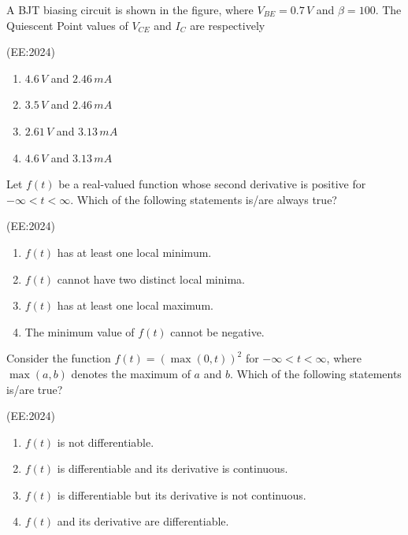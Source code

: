    \item A BJT biasing circuit is shown in the figure, where $V_{BE} = 0.7\, V$ and $\beta = 100$. The Quiescent Point values of $V_{CE}$ and $I_C$ are respectively 
	    
	   
	    \hfill{(EE:2024)}
		\begin{multicols}{2}
    \begin{enumerate}
        \item $4.6\, V$ and $2.46\, mA$
        \item $3.5\, V$ and $2.46\, mA$
        \item $2.61\, V$ and $3.13\, mA$
        \item $4.6\, V$ and $3.13\, mA$
    \end{enumerate}
			\end{multicols}

    \item Let $f(t)$ be a real-valued function whose second derivative is positive for $-\infty < t < \infty$. Which of the following statements is/are always true?
	  
	    \hfill{(EE:2024)}

    \begin{enumerate}
        \item $f(t)$ has at least one local minimum.
        \item $f(t)$ cannot have two distinct local minima.
        \item $f(t)$ has at least one local maximum.
        \item The minimum value of $f(t)$ cannot be negative.
    \end{enumerate}

    \item Consider the function $f(t) = (\max(0, t))^2$ for $-\infty < t < \infty$, where $\max(a, b)$ denotes the maximum of $a$ and $b$. Which of the following statements is/are true? 

	    \hfill{(EE:2024)}
    \begin{enumerate}
        \item $f(t)$ is not differentiable.
        \item $f(t)$ is differentiable and its derivative is continuous.
        \item $f(t)$ is differentiable but its derivative is not continuous.
        \item $f(t)$ and its derivative are differentiable.
    \end{enumerate}

